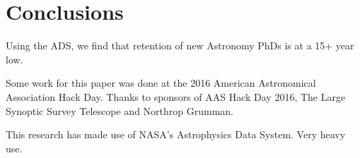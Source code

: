 \documentclass{emulateapj}
\begin{document}
\section{Conclusions}
Using the ADS, we find that retention of new Astronomy PhDs is at a 15+ year low.  


\acknowledgments
Some work for this paper was done at the 2016 American Astronomical Association Hack Day. Thanks to sponsors of AAS Hack Day 2016, The Large Synoptic Survey Telescope and Northrop Grumman.

This research has made use of NASA's Astrophysics Data System. Very heavy use.


\end{document}
